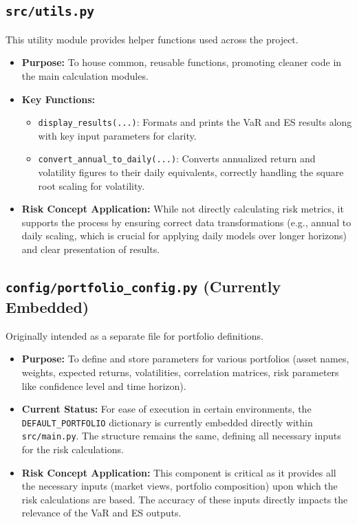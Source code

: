 \documentclass[11pt,a4paper]{article}
\begin{document}
\subsection{\texttt{src/utils.py}}
This utility module provides helper functions used across the project.
\begin{itemize}
    \item \textbf{Purpose:} To house common, reusable functions, promoting cleaner code in the main calculation modules.
    \item \textbf{Key Functions:}
        \begin{itemize}
            \item \texttt{display\_results(...)}: Formats and prints the VaR and ES results along with key input parameters for clarity.
            \item \texttt{convert\_annual\_to\_daily(...)}: Converts annualized return and volatility figures to their daily equivalents, correctly handling the square root scaling for volatility.
        \end{itemize}
    \item \textbf{Risk Concept Application:} While not directly calculating risk metrics, it supports the process by ensuring correct data transformations (e.g., annual to daily scaling, which is crucial for applying daily models over longer horizons) and clear presentation of results.
\end{itemize}

\subsection{\texttt{config/portfolio\_config.py} (Currently Embedded)}
Originally intended as a separate file for portfolio definitions.
\begin{itemize}
    \item \textbf{Purpose:} To define and store parameters for various portfolios (asset names, weights, expected returns, volatilities, correlation matrices, risk parameters like confidence level and time horizon).
    \item \textbf{Current Status:} For ease of execution in certain environments, the \texttt{DEFAULT\_PORTFOLIO} dictionary is currently embedded directly within \texttt{src/main.py}. The structure remains the same, defining all necessary inputs for the risk calculations.
    \item \textbf{Risk Concept Application:} This component is critical as it provides all the necessary inputs (market views, portfolio composition) upon which the risk calculations are based. The accuracy of these inputs directly impacts the relevance of the VaR and ES outputs.
\end{itemize}
\end{document}
